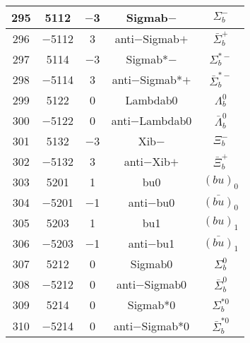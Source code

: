 \documentclass{article}
\begin{document}
\begin{table}[!htbp]
\begin{tabular}{|c|c|c|c|c|}
\hline
295 & 5112 & $-$3 & Sigma\underline{\hspace{0.6em}}b$-$ & $\Sigma_{b}^{-}$ \\
\hline
296 & $-$5112 & 3 & anti$-$Sigma\underline{\hspace{0.6em}}b$+$ & $\bar{\Sigma}_{b}^{+}$ \\
\hline
297 & 5114 & $-$3 & Sigma\underline{\hspace{0.6em}}b*$-$ & $\Sigma_{b}^{*-}$ \\
\hline
298 & $-$5114 & 3 & anti$-$Sigma\underline{\hspace{0.6em}}b*$+$ & $\bar{\Sigma}_{b}^{*-}$ \\
\hline
299 & 5122 & 0 & Lambda\underline{\hspace{0.6em}}b0 & $\Lambda_{b}^{0}$ \\
\hline
300 & $-$5122 & 0 & anti$-$Lambda\underline{\hspace{0.6em}}b0 & $\bar{\Lambda}_{b}^{0}$ \\
\hline
301 & 5132 & $-$3 & Xi\underline{\hspace{0.6em}}b$-$ & $\Xi_{b}^{-}$ \\
\hline
302 & $-$5132 & 3 & anti$-$Xi\underline{\hspace{0.6em}}b$+$ & $\bar{\Xi}_{b}^{+}$ \\
\hline
303 & 5201 & 1 & bu\underline{\hspace{0.6em}}0 & $(bu)_{0}$ \\
\hline
304 & $-$5201 & $-$1 & anti$-$bu\underline{\hspace{0.6em}}0 & $\bar{(bu)}_{0}$ \\
\hline
305 & 5203 & 1 & bu\underline{\hspace{0.6em}}1 & $(bu)_{1}$ \\
\hline
306 & $-$5203 & $-$1 & anti$-$bu\underline{\hspace{0.6em}}1 & $\bar{(bu)}_{1}$ \\
\hline
307 & 5212 & 0 & Sigma\underline{\hspace{0.6em}}b0 & $\Sigma_{b}^{0}$ \\
\hline
308 & $-$5212 & 0 & anti$-$Sigma\underline{\hspace{0.6em}}b0 & $\bar{\Sigma}_{b}^{0}$ \\
\hline
309 & 5214 & 0 & Sigma\underline{\hspace{0.6em}}b*0 & $\Sigma_{b}^{*0}$ \\
\hline
310 & $-$5214 & 0 & anti$-$Sigma\underline{\hspace{0.6em}}b*0 & $\bar{\Sigma}_{b}^{*0}$ \\

\end{tabular}
\end{table}
\end{document}
